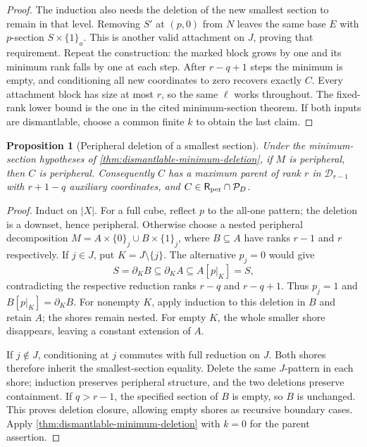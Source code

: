 \documentclass[11pt]{article}
\newtheorem{proposition}{Proposition}[section]
\theoremstyle{definition}
\begin{document}
\begin{proof}
The induction also needs the deletion of the new smallest section to
remain in that level. Removing $S'$ at $(p,0)$ from $N$ leaves the
same base $E$ with $p$-section $S\times\{1\}_a$. This is another
valid attachment on $J$, proving that requirement.
Repeat the construction: the marked block grows by one and its
minimum rank falls by one at each step. After $r-q+1$ steps the
minimum is empty, and conditioning all new coordinates to zero
recovers exactly $C$. Every attachment block has size at most $r$,
so the same $\ell$ works throughout. The fixed-rank lower bound
is the one in the cited minimum-section theorem. If both inputs
are dismantlable, choose a common finite $k$ to obtain the last claim.
\end{proof}

\begin{proposition}[Peripheral deletion of a smallest section]
\label{prop:peripheral-minimum-deletion}
Under the minimum-section hypotheses of
\cref{thm:dismantlable-minimum-deletion}, if $M$ is peripheral, then $C$
is peripheral. Consequently $C$ has a maximum parent of rank $r$ in
$\mathcal D_{r-1}$ with $r+1-q$ auxiliary coordinates, and
$C\in\mathsf R_{\rm per}\cap\mathcal P_D$.
\end{proposition}
\begin{proof}
Induct on $|X|$. For a full cube, reflect $p$ to the all-one pattern;
the deletion is a downset, hence peripheral. Otherwise choose a nested
peripheral decomposition $M=A\times\{0\}_j\cup B\times\{1\}_j$,
where $B\subseteq A$ have ranks $r-1$ and $r$ respectively.
If $j\in J$, put $K=J\setminus\{j\}$. The alternative $p_j=0$ would give
\[
 S=\partial_K B\subseteq\partial_K A\subseteq A[p|_K]=S,
\]
contradicting the respective reduction ranks $r-q$ and $r-q+1$.
Thus $p_j=1$ and $B[p|_K]=\partial_KB$. For nonempty $K$, apply
induction to this deletion in $B$ and retain $A$; the shores remain
nested. For empty $K$, the whole smaller shore disappears, leaving a
constant extension of $A$.

If $j\notin J$, conditioning at $j$ commutes with full reduction on $J$.
Both shores therefore inherit the smallest-section equality. Delete the
same $J$-pattern in each shore; induction preserves peripheral structure,
and the two deletions preserve containment. If $q>r-1$, the specified
section of $B$ is empty, so $B$ is unchanged. This proves deletion
closure, allowing empty shores as recursive boundary cases. Apply
\cref{thm:dismantlable-minimum-deletion} with $k=0$ for the parent assertion.
\end{proof}
\end{document}
